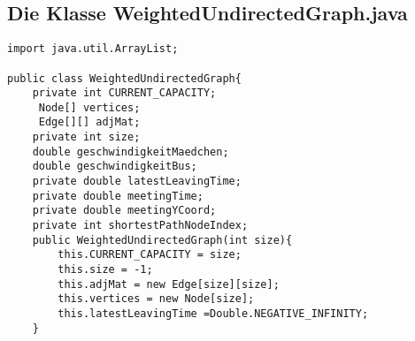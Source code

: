 \documentclass[a4paper,10pt,ngerman]{scrartcl}
\begin{document}
\subsection{Die Klasse WeightedUndirectedGraph.java}
\begin{lstlisting}[frame=single]
import java.util.ArrayList;

public class WeightedUndirectedGraph{
    private int CURRENT_CAPACITY;
     Node[] vertices;
     Edge[][] adjMat;
    private int size;
    double geschwindigkeitMaedchen;
    double geschwindigkeitBus;
    private double latestLeavingTime;
    private double meetingTime;
    private double meetingYCoord;
    private int shortestPathNodeIndex;
    public WeightedUndirectedGraph(int size){
        this.CURRENT_CAPACITY = size;
        this.size = -1;
        this.adjMat = new Edge[size][size];
        this.vertices = new Node[size];
        this.latestLeavingTime =Double.NEGATIVE_INFINITY;
    }


\end{lstlisting}
\end{document}
